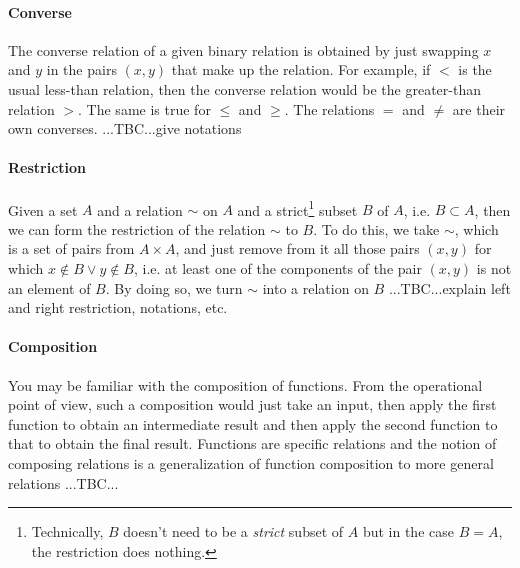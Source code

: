
\paragraph{Converse} The converse relation of a given binary relation is obtained by just swapping $x$ and $y$ in the pairs $(x,y)$ that make up the relation. For example, if $<$ is the usual less-than relation, then the converse relation would be the greater-than relation $>$. The same is true for $\leq$ and $\geq$. The relations $=$ and $\neq$ are their own converses. 
...TBC...give notations

\paragraph{Restriction}
Given a set $A$ and a relation $\sim$ on $A$ and a strict\footnote{Technically, $B$ doesn't need to be a \emph{strict} subset of $A$ but in the case $B=A$, the restriction does nothing.} subset $B$ of $A$, i.e. $B \subset A$, then we can form the restriction of the relation $\sim$ to $B$. To do this, we take $\sim$, which is a set of pairs from $A \times A$, and just remove from it all those pairs $(x,y)$ for which $x \notin B \vee y \notin B$, i.e. at least one of the components of the pair $(x,y)$ is not an element of $B$. By doing so, we turn $\sim$ into a relation on $B$
...TBC...explain left and right restriction, notations, etc.


\paragraph{Composition}
You may be familiar with the composition of functions. From the operational point of view, such a composition would just take an input, then apply the first function to obtain an intermediate result and then apply the second function to that to obtain the final result. Functions are specific relations and the notion of composing relations is a generalization of function composition to more general relations ...TBC...






